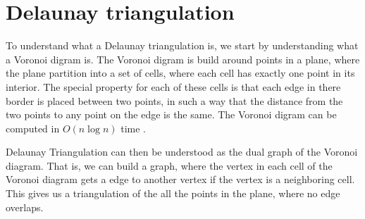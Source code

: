 \chapter{Delaunay triangulation}\label{appendix:delaunaykruskal}

To understand what a Delaunay triangulation is, we start by understanding what a 
Voronoi digram is. The Voronoi digram is build around points in a plane, where 
the plane partition into a set of cells, where each cell has exactly one point 
in its interior. The special property for each of these cells is that each edge 
in there border is placed between two points, in such a way that the distance 
from the two points to any point on the edge is the same. The Voronoi digram can 
be computed in $O(n \log n)$ time \cite{CompGeo}. 

Delaunay Triangulation can then be understood as the dual graph of the Voronoi 
diagram. That is, we can build a graph, where the vertex in each cell of the 
Voronoi diagram gets a edge to another vertex if the vertex is a neighboring 
cell. This gives us a triangulation of the all the points in the plane, where
no edge overlaps.

